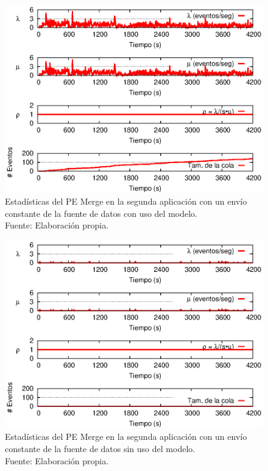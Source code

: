 \begin{figure}[!ht]
    \centering
    \captionsetup{justification=centering}
    \includegraphics[scale=1]{images/exp/app2/uniform/cm/statusMergePE.eps}
    \caption[Estadísticas del PE Merge en la segunda aplicación con un envío constante de la fuente de datos con uso del modelo.]{Estadísticas del PE Merge en la segunda aplicación con un envío constante de la fuente de datos con uso del modelo.\\Fuente: Elaboración propia.}
    \label{fig:app2-uniform-statusMergePE-cm}
\end{figure}

\begin{figure}[!ht]
    \centering
    \captionsetup{justification=centering}
    \includegraphics[scale=1]{images/exp/app2/uniform/sm/statusMergePE.eps}
    \caption[Estadísticas del PE Merge en la segunda aplicación con un envío constante de la fuente de datos sin uso del modelo.]{Estadísticas del PE Merge en la segunda aplicación con un envío constante de la fuente de datos sin uso del modelo.\\Fuente: Elaboración propia.}
    \label{fig:app2-uniform-statusMergePE-sm}
\end{figure}

